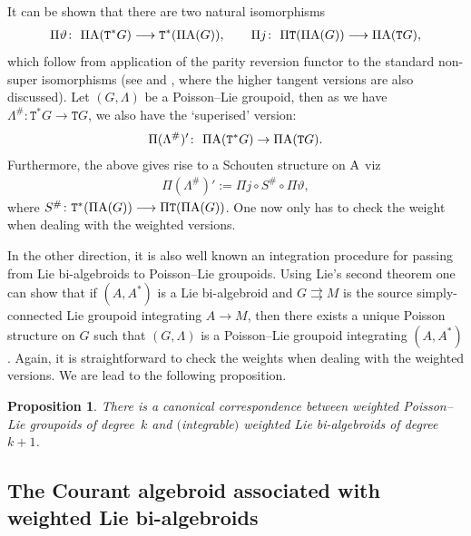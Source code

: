 \documentclass[pdftex]{sigma}
\def\sT{{\mathtt T}}
\numberwithin{equation}{section}
\newtheorem{Proposition}[Theorem]{Proposition}
 { \theoremstyle{definition}
\newtheorem{Definition}[Theorem]{Definition}
\newtheorem{Example}[Theorem]{Example}
\newtheorem{Remark}[Theorem]{Remark} }
\begin{document}
It can be shown that there are two natural isomorphisms
\begin{gather*}
 \Pi \vartheta \colon \  \Pi \textnormal{A}(\sT^{*}G)  \longrightarrow \sT^{*}(\Pi \textnormal{A}(G)), \qquad
 \Pi j \colon \ \Pi \sT (\Pi\textnormal{A}(G))  \longrightarrow  \Pi \textnormal{A}(\sT G),
\end{gather*}
 which follow from application of the parity reversion functor to the standard non-super isomorphisms (see \cite{Mackenzie2005, Mackenzie:2000} and \cite{KouotchopWamba:2013}, where the higher tangent versions are also discussed).  Let $(G, \Lambda)$ be a Poisson--Lie groupoid, then as we have  $\Lambda^{\#}\colon  \sT^{*}G \rightarrow \sT G$, we also have  the `superised' version:
\begin{gather*}
\Pi ( \Lambda^{\#})' \colon \ \Pi \textnormal{A}(\sT^{*}G) \rightarrow \Pi \textnormal{A}(\sT G).
\end{gather*}
Furthermore, the above gives  rise to a Schouten structure on $\textnormal{A}$ viz
\begin{gather*}
\Pi (\Lambda^{\#})' := \Pi j \circ S^{\#} \circ \Pi \vartheta,
\end{gather*}
where $S^{\#}\colon \sT^{*} (\Pi \textnormal{A}(G)) \longrightarrow \Pi \sT(\Pi \textnormal{A}(G))$. One now only has to check the weight when dealing with the weighted versions.

 In the other direction, it is also well known an integration procedure for passing from  Lie bi-algebroids to Poisson--Lie groupoids.  Using Lie's second theorem one can show that if $(A, A^{*})$ is a Lie bi-algebroid  and $G \rightrightarrows M$ is the source simply-connected Lie groupoid integrating $A \rightarrow M$, then there exists a unique Poisson structure on $G$ such that $(G,\Lambda)$ is a Poisson--Lie groupoid integrating $(A, A^{*})$. Again, it is straightforward to check the weights when dealing with the weighted versions. We are lead to the following proposition.
\begin{Proposition}
There is a canonical correspondence between weighted Poisson--Lie groupoids of degree~$k$ and
$($integrable$)$ weighted Lie bi-algebroids of degree~$k+1$.
\end{Proposition}


\subsection{The Courant algebroid associated with weighted Lie bi-algebroids}
\end{document}
